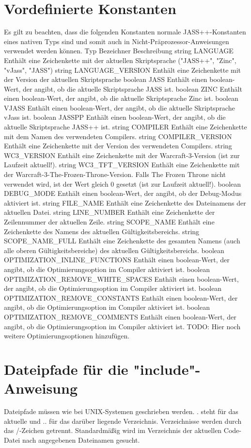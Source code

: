 \section { Vordefinierte Konstanten }
Es gilt zu beachten, dass die folgenden Konstanten normale JASS++-Konstanten eines nativen Typs sind und somit auch in Nicht-Präprozessor-Anweisungen verwendet werden können.
Typ Bezeichner					Beschreibung
string LANGUAGE					Enthält eine Zeichenkette mit der aktuellen Skriptsprache ("JASS++", "Zinc", "vJass", "JASS")
string LANGUAGE_VERSION				Enthält eine Zeichenkette mit der Version der aktuellen Skriptsprache
boolean JASS					Enthält einen boolean-Wert, der angibt, ob die aktuelle Skriptsprache JASS ist.
boolean ZINC					Enthält einen boolean-Wert, der angibt, ob die aktuelle Skriptsprache Zinc ist.
boolean VJASS					Enthält einen boolean-Wert, der angibt, ob die aktuelle Skriptsprache vJass ist.
boolean JASSPP					Enthält einen boolean-Wert, der angibt, ob die aktuelle Skriptsprache JASS++ ist.
string COMPILER					Enthält eine Zeichenkette mit dem Namen des verwendeten Compilers.
string COMPILER_VERSION				Enthält eine Zeichenkette mit der Version des verwendeten Compilers.
string WC3_VERSION				Enthält eine Zeichenkette mit der Warcraft-3-Version (ist zur Laufzeit aktuell!).
string WC3_TFT_VERSION				Enthält eine Zeichenkette mit der Warcraft-3-The-Frozen-Throne-Version. Falls The Frozen Throne nicht verwendet wird, ist der Wert gleich 0 gesetzt (ist zur Laufzeit aktuell!).
boolean DEBUG_MODE				Enthält einen boolean-Wert, der angibt, ob der Debug-Modus aktiviert ist.
string FILE_NAME				Enthält eine Zeichenkette des Dateinamens der aktuellen Datei.
string LINE_NUMBER				Enthält eine Zeichenkette der Zeilennummer der aktuellen Zeile.
string SCOPE_NAME				Enthält eine Zeichenkette des Namens des aktuellen Gültigkeitsbereichs.
string SCOPE_NAME_FULL				Enthält eine Zeichenkette des gesamten Namens (auch alle oberen Gültigkeitsbereiche) des aktuellen Gültigkeitsbereichs.
boolean OPTIMIZATION_INLINE_FUNCTIONS		Enthält einen boolean-Wert, der angibt, ob die Optimierungsoption im Compiler aktiviert ist.
boolean OPTIMIZATION_REMOVE_WHITE_SPACES	Enthält einen boolean-Wert, der angibt, ob die Optimierungsoption im Compiler aktiviert ist.
boolean OPTIMIZATION_REMOVE_CONSTANTS		Enthält einen boolean-Wert, der angibt, ob die Optimierungsoption im Compiler aktiviert ist.
boolean OPTIMIZATION_REMOVE_COMMENTS		Enthält einen boolean-Wert, der angibt, ob die Optimierungsoption im Compiler aktiviert ist.
TODO: Hier noch weitere Optimierungsoptionen hinzufügen.

\section { Dateipfade für die "include"-Anweisung }
Dateipfade müssen wie bei UNIX-Systemen geschrieben werden. . steht für das aktuelle und ..
für das darüber liegende Verzeichnis. Verzeichnisse werden durch das /-Zeichen getrennt.
Standardmäßig wird im Verzeichnis der aktuellen Code-Datei nach angegebenen Dateinamen gesucht.